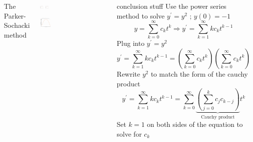 \documentclass[25pt, a0paper, portrait]{tikzposter}
\begin{document}
\begin{columns}
    {
        The Parker-Sochacki method 
    } 
    \begin{subcolumns}
    {
        \begin{tikzfigure}
        \includegraphics[width=0.05\textwidth]{images/PSM5 TS1 Plot.png}
        \includegraphics[width=0.05\textwidth]{images/PSM5 TS1 Plot.png}    
        \end{tikzfigure}
    }
    {
        \begin{tikzfigure}
        \includegraphics[width=0.16\textwidth]{images/PSM5 TS1 Plot.png}
        \end{tikzfigure}
    }
    \end{subcolumns}
    {
        conclusion stuff
    }
    {
        Use the power series method to solve $y^\prime = y^2$ ; $y(0) = -1$
        \begin{equation*}
            y = \sum\limits_{k=0}^{\infty}c_kt^k \Rightarrow y^\prime = \sum\limits_{k=1}^{\infty}kc_kt^{k-1}
        \end{equation*}
        Plug into $y^\prime = y^2$
        \begin{equation*}
            y^\prime = \sum\limits_{k=1}^{\infty}kc_kt^{k-1} = \left(\sum\limits_{k=0}^{\infty}c_kt^k\right) \left(\sum\limits_{k=0}^{\infty}c_kt^k\right)
        \end{equation*}
        Rewrite $y^2$ to match the form of the cauchy product
        \begin{equation}
            y^\prime = \sum\limits_{k=1}^{\infty}kc_kt^{k-1} = \sum\limits_{k=0}^{\infty} \underbrace{\left(\sum\limits_{j=0}^{k}c_jc_{k-j}\right)}_{\text{Cauchy product}}t^k
        \end{equation}
        Set $k = 1$ on both sides of the equation to solve for $c_k$
        \begin{equation*}

\end{equation*}}
\end{columns}
\end{document}
